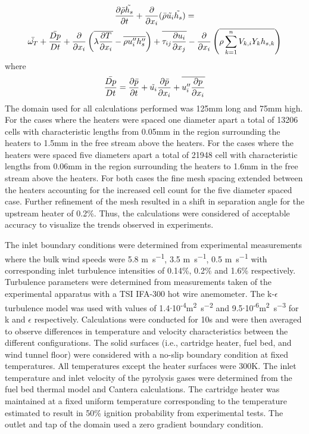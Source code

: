             \begin{multline}
                \pder[\bar{\rho}\tilde{h_s}]{t} + \pder{x_i} (\bar{\rho} \tilde{u_i} \tilde{h_s}) = \\ \bar{\dot{\omega_T}} + \frac{\bar{Dp}}{Dt} + \pder{x_i} \left( \overline{\lambda \pder[T]{x_i}} - \overline{\rho u''_i h''_s} \right) + \overline{\tau_{ij} \pder[u_i]{x_j}} - \pder{x_i} \left( \overline{\rho \sum_{k=1}^n V_{k,i} Y_k h_{s,k}} \right)
            \end{multline}
        where
            \begin{equation}
                \frac{\bar{Dp}}{Dt} = \pder[\bar{p}]{t} + \tilde{u_i} \pder[\bar{p}]{x_i}+ \overline{u''_i \pder[p]{x_i}}    
            \end{equation}
     The domain used for all calculations performed was 125\si{\milli\meter} long and 75\si{\milli\meter} high. For the cases where the heaters were spaced one diameter apart a total of 13206 cells with characteristic lengths from 0.05\si{\milli\meter} in the region surrounding the heaters to 1.5\si{\milli\meter} in the free stream above the heaters. For the cases where the heaters were spaced five diameters apart a total of 21948 cell with characteristic lengths from 0.06\si{\milli\meter} in the region surrounding the heaters to 1.6\si{\milli\meter} in the free stream above the heaters. For both cases the fine mesh spacing extended between the heaters accounting for the increased cell count for the five diameter spaced case. Further refinement of the mesh resulted in a shift in separation angle for the upstream heater of 0.2\%. Thus, the calculations were considered of acceptable accuracy to visualize the trends observed in experiments.
    
    The inlet boundary conditions were determined from experimental measurements where the bulk wind speeds were 5.8 \si{\meter\per\second}, 3.5 \si{\meter\per\second}, 0.5 \si{\meter\per\second} with corresponding inlet turbulence intensities of 0.14\%, 0.2\% and 1.6\% respectively. Turbulence parameters were determined from measurements taken of the experimental apparatus with a TSI IFA-300 hot wire anemometer. The k-$\epsilon$ turbulence model was used with values of 1.4$\cdot$10\textsuperscript{-4}\si{\square\meter\per\square\second} and 9.5$\cdot$10\textsuperscript{-6}\si{\square\meter\per\cubic\second} for k and $\epsilon$ respectively. Calculations were conducted for 10\si{\second} and were then averaged to observe differences in temperature and velocity characteristics between the different configurations. The solid surfaces (i.e., cartridge heater, fuel bed, and wind tunnel floor) were considered with a no-slip boundary condition at fixed temperatures. All temperatures except the heater surfaces were 300\si{\kelvin}. The inlet temperature and inlet velocity of the pyrolysis gases were determined from the fuel bed thermal model and Cantera calculations. The cartridge heater was maintained at a fixed uniform temperature corresponding to the temperature estimated to result in 50\% ignition probability from experimental tests. The outlet and tap of the domain used a zero gradient boundary condition. 
    
